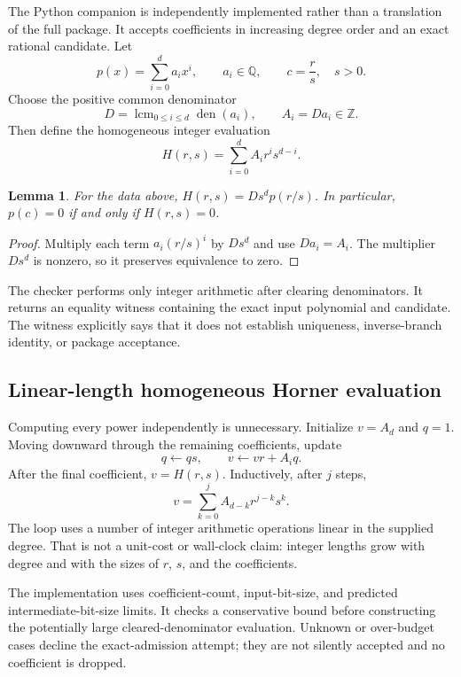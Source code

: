 \documentclass[11pt,letterpaper]{article}
\newtheorem{lemma}[proposition]{Lemma}
\begin{document}
The Python companion is independently implemented rather than a translation of the full package. It accepts coefficients in increasing degree order and an exact rational candidate. Let
\[
 p(x)=\sum_{i=0}^{d}a_i x^i,\qquad a_i\in\mathbb Q,
 \qquad c=\frac{r}{s},\quad s>0.
\]
Choose the positive common denominator
\[
 D=\operatorname{lcm}_{0\leq i\leq d}\operatorname{den}(a_i),
 \qquad A_i=Da_i\in\mathbb Z.
\]
Then define the homogeneous integer evaluation
\begin{equation}\label{eq:homogeneous}
 H(r,s)=\sum_{i=0}^{d}A_i r^i s^{d-i}.
\end{equation}

\begin{lemma}
For the data above, $H(r,s)=Ds^d p(r/s)$. In particular, $p(c)=0$ if and only if $H(r,s)=0$.
\end{lemma}
\begin{proof}
Multiply each term $a_i(r/s)^i$ by $Ds^d$ and use $Da_i=A_i$. The multiplier $Ds^d$ is nonzero, so it preserves equivalence to zero.
\end{proof}

The checker performs only integer arithmetic after clearing denominators. It returns an equality witness containing the exact input polynomial and candidate. The witness explicitly says that it does not establish uniqueness, inverse-branch identity, or package acceptance.

\subsection{Linear-length homogeneous Horner evaluation}

Computing every power independently is unnecessary. Initialize $v=A_d$ and $q=1$. Moving downward through the remaining coefficients, update
\[
 q\leftarrow q s,\qquad v\leftarrow vr+A_i q.
\]
After the final coefficient, $v=H(r,s)$. Inductively, after $j$ steps,
\[
 v=\sum_{k=0}^{j} A_{d-k}r^{j-k}s^k.
\]
The loop uses a number of integer arithmetic operations linear in the supplied degree. That is not a unit-cost or wall-clock claim: integer lengths grow with degree and with the sizes of $r$, $s$, and the coefficients.

The implementation uses coefficient-count, input-bit-size, and predicted intermediate-bit-size limits. It checks a conservative bound before constructing the potentially large cleared-denominator evaluation. Unknown or over-budget cases decline the exact-admission attempt; they are not silently accepted and no coefficient is dropped.
\end{document}
